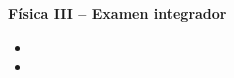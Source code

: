 \documentclass[addpoints]{exam}
\begin{document}
\renewcommand{\tablename}{Tabla}


\begin{tcolorbox}[colback=white,arc=0mm,colframe=black]
    \begin{center}
        \Large\textbf{Física III -- Examen integrador}
    \end{center}
\end{tcolorbox}

\begin{itemize}
    \item {}
    \item {}
\end{itemize}
\end{document}
